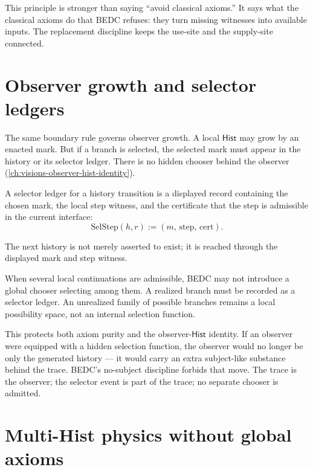 This principle is stronger than saying ``avoid classical axioms.'' It says what the classical axioms do that BEDC refuses: they turn missing witnesses into available inputs. The replacement discipline keeps the use-site and the supply-site connected.

\section{Observer growth and selector ledgers}
\label{sec:external-supply-observer-selectors}

The same boundary rule governs observer growth. A local $\mathsf{Hist}$ may grow by an enacted mark. But if a branch is selected, the selected mark must appear in the history or its selector ledger. There is no hidden chooser behind the observer (\autoref{ch:visions-observer-hist-identity}).

\begin{definition}
\label{def:external-supply-selector-ledger}
A selector ledger for a history transition is a displayed record containing the chosen mark, the local step witness, and the certificate that the step is admissible in the current interface:
$$
\mathrm{SelStep}(h,r) := (m,\, \mathrm{step},\, \mathrm{cert}).
$$
\end{definition}

The next history is not merely asserted to exist; it is reached through the displayed mark and step witness.

\begin{principle}
\label{prin:external-supply-no-observer-choice}
When several local continuations are admissible, BEDC may not introduce a global chooser selecting among them. A realized branch must be recorded as a selector ledger. An unrealized family of possible branches remains a local possibility space, not an internal selection function.
\end{principle}

This protects both axiom purity and the observer-$\mathsf{Hist}$ identity. If an observer were equipped with a hidden selection function, the observer would no longer be only the generated history --- it would carry an extra subject-like substance behind the trace. BEDC's no-subject discipline forbids that move. The trace is the observer; the selector event is part of the trace; no separate chooser is admitted.

\section{Multi-Hist physics without global axioms}
\label{sec:external-supply-multihist-physics}

